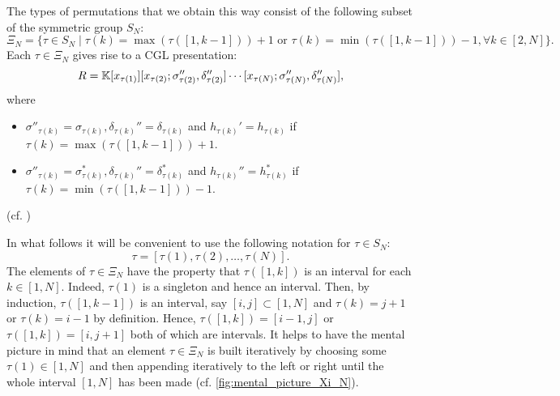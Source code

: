 %
The types of permutations that we obtain this way consist of the following subset of
the symmetric group $S_N$:
\begin{equation*}
	\Xi_N = \{\tau \in S_N \mid \tau(k) = \max (\tau ([1, k-1])) + 1 \text{ or } \tau(k) = \min (\tau ([1, k-1])) - 1, \forall k \in [2, N]\}.
\end{equation*}
%
Each $\tau \in \Xi_N$ gives rise to a CGL presentation:
\begin{equation*}
	R = \mathbb{K}[x_{\tau(1)}][x_{\tau(2)}; \sigma_{\tau(2)}'', \delta_{\tau(2)}''] \cdots [x_{\tau(N)}; \sigma_{\tau(N)}'', \delta_{\tau(N)}''],
\end{equation*}
%
where
\begin{itemize}
	\item $\sigma''_{\tau(k)} = \sigma_{\tau(k)}, \delta_{\tau(k)}'' = \delta_{\tau(k)}$
	      and $h_{\tau(k)}' = h_{\tau(k)}$ if $\tau(k) = \max(\tau([1,k-1])) + 1$.
	\item
	      $\sigma''_{\tau(k)} = \sigma^*_{\tau(k)}, \delta_{\tau(k)}'' = \delta^*_{\tau(k)}$ and
	      $h_{\tau(k)}'' = h_{\tau(k)}^*$ if $\tau(k) = \min(\tau([1,k-1])) - 1$.
\end{itemize}
(cf. \cite[Proposition 3.14]{GoodearlYakimov2017QCA})

In what follows it will be convenient to use the following notation for $\tau \in S_N$:
\begin{equation*}
	\tau = [\tau(1), \tau(2), \dots, \tau(N)].
\end{equation*}
%
The elements of $\tau \in \Xi_N$ have the property that $\tau([1, k])$ is an interval for each $k \in [1, N]$. Indeed, $\tau(1)$ is a singleton and hence an interval. Then, by induction, $\tau([1, k-1])$ is an interval, say $[i, j] \subset [1, N]$ and $\tau(k) = j + 1$ or $\tau(k) = i - 1$ by definition. Hence, $\tau([1, k]) = [i-1, j]$ or $\tau([1, k]) = [i, j+1]$ both of which are intervals. It helps to have the mental picture in mind that an element $\tau \in \Xi_N$ is built iteratively by choosing some $\tau(1) \in [1, N]$ and then appending iteratively to the left or right until the whole interval $[1, N]$ has been made (cf. \cref{fig:mental_picture_Xi_N}).

